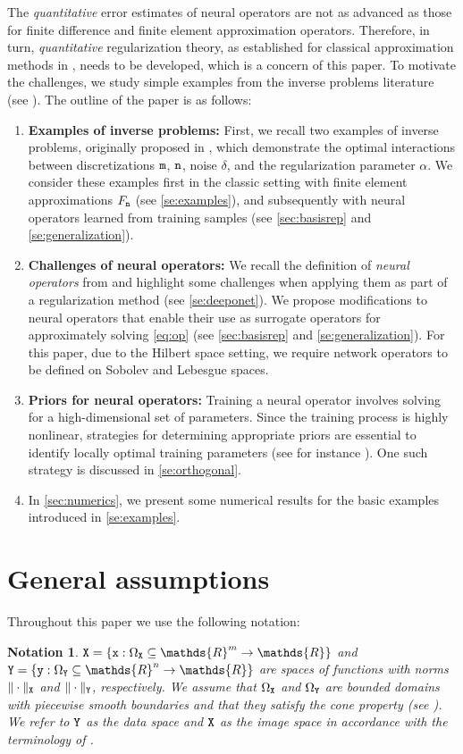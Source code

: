 \documentclass[10pt]{article}
\numberwithin{equation}{section}
\newtheorem{notation}[notation]{Notation}
\theoremstyle{nonumberplain}
\newcommand{\R}{\mathds{R}}
\newcommand{\norms}[1]{\|#1\|}
\newcommand{\set}[1]{\left\{#1\right\}}
\newcommand{\X}{{\tt X}}
\newcommand{\Y}{{\tt Y}}
\newcommand{\y}{{\tt y}}
\newcommand{\m}{{\tt m}}
\newcommand{\n}{{\tt n}}
\newcommand{\x}{{\tt x}}
\begin{document}
The \emph{quantitative} error estimates of neural operators are not as advanced as those for finite difference and finite element approximation operators. Therefore, in turn, \emph{quantitative} regularization theory, as established for classical approximation methods in \cite{Neu89,NeuSch90,PoeResSch10}, needs to be developed, which is a concern of this paper. To motivate the challenges, we study simple examples from the inverse problems literature (see \cite{EngKunNeu89,EngHanNeu96}). The outline of the paper is as follows:
\begin{enumerate}
	\item \textbf{Examples of inverse problems:} First, we recall two examples of inverse problems, originally proposed in \cite{EngKunNeu89}, which demonstrate the optimal interactions between discretizations $\m$, $\n$, noise $\delta$, and the regularization parameter $\alpha$. We consider these examples first in the classic setting with finite element approximations $F_\n$ (see \autoref{se:examples}), and subsequently with neural operators learned from training samples (see \autoref{sec:basisrep} and \autoref{se:generalization}).
	\item \textbf{Challenges of neural operators:} We recall the definition of \emph{neural operators} from \cite{LuJinPanZhaKar21} and highlight some challenges when applying them as part of a regularization method (see \autoref{se:deeponet}). We propose modifications to neural operators that enable their use as surrogate operators for approximately solving \autoref{eq:op} (see \autoref{sec:basisrep} and \autoref{se:generalization}). For this paper, due to the Hilbert space setting, we require network operators to be defined on Sobolev and Lebesgue spaces. 
	\item \textbf{Priors for neural operators:} Training a neural operator involves solving for a high-dimensional set of parameters. Since the training process is highly nonlinear, strategies for determining appropriate priors are essential to identify locally optimal training parameters (see for instance \cite{SchHofNas23}). One such strategy is discussed in \autoref{se:orthogonal}.  
	\item In \autoref{sec:numerics}, we present some numerical results for the basic examples introduced in \autoref{se:examples}.
\end{enumerate}

\section{General assumptions} \label{sec:assump}
Throughout this paper we use the following notation:
\begin{notation} \label{not:xy}
	$\X = \set{\x: \Omega_\X \subseteq \R^m \to \R}$ and $\Y=\set{\y:\Omega_\Y \subseteq \R^n \to \R}$ are spaces of functions with norms $\norms{\cdot}_\X$ and $\norms{\cdot}_\Y$, respectively. We assume that $\Omega_\X$ and $\Omega_\Y$ are bounded domains with piecewise smooth boundaries and that they satisfy the cone property (see \cite{Ada75}). We refer to $\Y$ as the \emph{data space} and $\X$ as the \emph{image space} in accordance with the terminology of \cite{AspKorSch20,AspFriKorSch21}. 
\end{notation}
\end{document}
